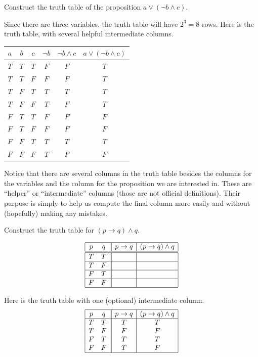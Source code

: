 \begin{exa}\label{exa:truth_table_example}
Construct the truth table of the proposition $a \vee  (\neg b \wedge c)$.
\begin{sol}
Since there are three variables, the truth table will have
$2^3 = 8$ rows. Here is the truth table, with several helpful intermediate columns.

\centering
\begin{tabular}{|ccc||c|c|c|}
\hline $a$ & $b$ & $c$ & $\neg b$ & $\neg b \wedge c$ & $a \vee
(\neg b
\wedge c)$ \\
\hline
$T$ & $T$ & $T$ & $F$ & $F $ & $T $ \\
$T$ & $T$ & $F$ & $F $ & $F $ & $T $ \\
$T$ & $F$ & $T$ & $T $ & $T $ & $T $ \\
$T$ & $F$ & $F$ & $ T$ & $F $ & $T $ \\
$F$ & $T$ & $T$ & $F $ & $F $ & $F $ \\
$F$ & $T$ & $F$ & $F $ & $F $ & $F $ \\
$F$ & $F$ & $T$ & $T $ & $T $ & $T $ \\
$F$ & $F$ & $F$ & $T $ & $F $ & $F $ \\
\hline
\end{tabular}
\end{sol}
\end{exa}


\begin{rem}
Notice that there are several columns in the truth table besides the columns for
the variables and the column for the proposition we are interested in.
These are ``helper'' or ``intermediate'' columns (those are not official definitions).
Their purpose is simply to help us compute the final column more easily and without
(hopefully) making any mistakes.
\end{rem}


\begin{exer}
Construct the truth table for  $(p\rightarrow q) \wedge q$. 

{\large
$$ 
\begin{array}{|cc||c|c|} 
\hline 
p & q &p\rightarrow q &(p \rightarrow q) \wedge q\\
\hline
\hline
T & T &  &  \\
\hline
T & F &  &  \\
\hline
F & T &  &  \\
\hline
F & F &  &  \\
\hline
\end{array}
$$
}
\begin{answer}
Here is the truth table with one (optional) intermediate column.
$$ \begin{array}{|cc||c|c|} \hline p & q & p  \rightarrow q & (p \rightarrow q) \wedge q \\
\hline
T & T & T & T\\
T & F & F & F \\
F & T & T & T \\
F & F & T & F \\
\hline
\end{array}$$
\end{answer}
\end{exer}

